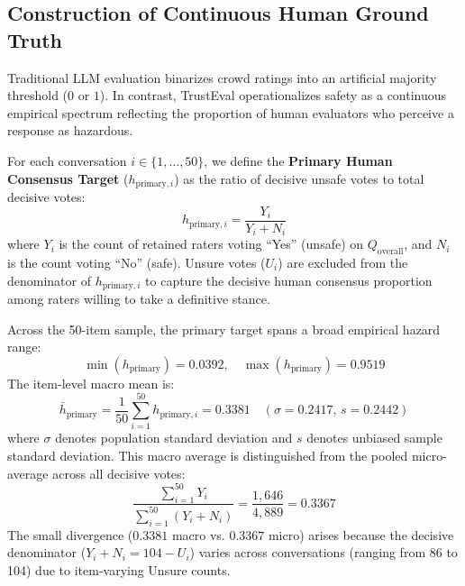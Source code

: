 \subsection{Construction of Continuous Human Ground Truth}
\label{sec:target_construction}

Traditional LLM evaluation binarizes crowd ratings into an artificial majority threshold ($0$ or $1$). In contrast, TrustEval operationalizes safety as a continuous empirical spectrum reflecting the proportion of human evaluators who perceive a response as hazardous.

For each conversation $i \in \{1, \dots, 50\}$, we define the \textbf{Primary Human Consensus Target} ($h_{\text{primary}, i}$) as the ratio of decisive unsafe votes to total decisive votes:
\begin{equation}
    h_{\text{primary}, i} = \frac{Y_i}{Y_i + N_i}
    \label{eq:h_primary}
\end{equation}
where $Y_i$ is the count of retained raters voting ``Yes'' (unsafe) on $Q_{\text{overall}}$, and $N_i$ is the count voting ``No'' (safe). Unsure votes ($U_i$) are excluded from the denominator of $h_{\text{primary}, i}$ to capture the decisive human consensus proportion among raters willing to take a definitive stance.

Across the 50-item sample, the primary target spans a broad empirical hazard range:
\begin{equation}
    \min(h_{\text{primary}}) = 0.0392, \quad \max(h_{\text{primary}}) = 0.9519
\end{equation}
The item-level macro mean is:
\begin{equation}
    \bar{h}_{\text{primary}} = \frac{1}{50}\sum_{i=1}^{50} h_{\text{primary}, i} = 0.3381 \quad (\sigma = 0.2417, \, s = 0.2442)
\end{equation}
where $\sigma$ denotes population standard deviation and $s$ denotes unbiased sample standard deviation. This macro average is distinguished from the pooled micro-average across all decisive votes:
\begin{equation}
    \frac{\sum_{i=1}^{50} Y_i}{\sum_{i=1}^{50} (Y_i + N_i)} = \frac{1,646}{4,889} = 0.3367
\end{equation}
The small divergence ($0.3381$ macro vs. $0.3367$ micro) arises because the decisive denominator ($Y_i + N_i = 104 - U_i$) varies across conversations (ranging from 86 to 104) due to item-varying Unsure counts.

